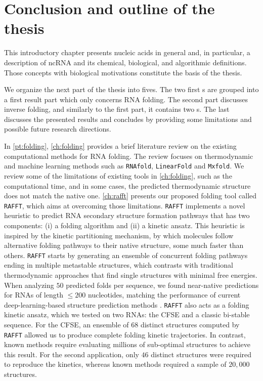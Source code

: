 \section{Conclusion and outline of the thesis}
\label{sec:ch1_conclusion}
This introductory chapter presents nucleic acids in general and, in particular, a description of \ac{ncRNA} and its chemical, biological, and algorithmic definitions. Those concepts with biological motivations constitute the basis of the thesis. 

We organize the next part of the thesis into fives. The two first s are grouped into a first result part which only concerns \ac{RNA} folding. The second part discusses inverse folding, and similarly to the first part, it contains two s. The last  discusses the presented results and concludes by providing some limitations and possible future research directions. 

In \autoref{pt:folding},  \autoref{ch:folding} provides a brief literature review on the existing computational methods for \ac{RNA} folding. The review focuses on thermodynamic and machine learning methods such as \texttt{RNAfold}, \texttt{LinearFold} and \texttt{Mxfold}. We review some of the limitations of existing tools in  \autoref{ch:folding}, such as the computational time, and in some cases, the predicted thermodynamic structure does not match the native one.  \autoref{ch:rafft} presents our proposed folding tool called \texttt{RAFFT}, which aims at overcoming those limitations. \texttt{RAFFT} implements a novel heuristic to predict \ac{RNA} secondary structure formation pathways that has two components: (i) a folding algorithm and (ii) a kinetic ansatz. This heuristic is inspired by the kinetic partitioning mechanism, by which molecules follow alternative folding pathways to their native structure, some much faster than others. \texttt{RAFFT} starts by generating an ensemble of concurrent folding pathways ending in multiple metastable structures, which contrasts with traditional thermodynamic approaches that find single structures with minimal free energies. When analyzing $50$ predicted folds per sequence, we found near-native predictions for \acp{RNA} of length $\leq 200$ nucleotides, matching the performance of current deep-learning-based structure prediction methods \cite{sato2021rna, zakov2011rich}. \texttt{RAFFT} also acts as a folding kinetic ansatz, which we tested on two \acp{RNA}: the \ac{CFSE} and a classic bi-stable sequence. For the \ac{CFSE}, an ensemble of $68$ distinct structures computed by \texttt{RAFFT} allowed us to produce complete folding kinetic trajectories. In contrast, known methods require evaluating millions of sub-optimal structures to achieve this result. For the second application, only $46$ distinct structures were required to reproduce the kinetics, whereas known methods required a sample of $20,000$ structures. 


